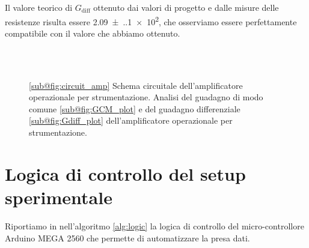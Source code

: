 \documentclass[
    prl,
    reprint, 
    superscriptaddress, 
    altaffilletter, 
    amsmath, 
    amssymb, 
    a4paper,
    varvw]{revtex4-2}
\begin{document}
Il valore teorico di $G_\text{diff}$ ottenuto dai valori di progetto e dalle misure delle resistenze risulta essere \num{2.09(.10)e2}, che osserviamo essere perfettamente compatibile con il valore che abbiamo ottenuto. 

\begin{figure}
    \centering
    \\
    \\

    \caption{
        \ref{sub@fig:circuit_amp} Schema circuitale dell'amplificatore operazionale per strumentazione.
        Analisi del guadagno di modo comune \ref{sub@fig:GCM_plot} e del guadagno differenziale \ref{sub@fig:Gdiff_plot} dell'amplificatore operazionale per strumentazione. 
    }
\end{figure}

\section{Logica di controllo del setup sperimentale}\label{sec:control_logic}

Riportiamo  in nell'algoritmo \ref{alg:logic} la logica di controllo del micro-controllore Arduino MEGA 2560 che permette di automatizzare la presa dati.
\end{document}
